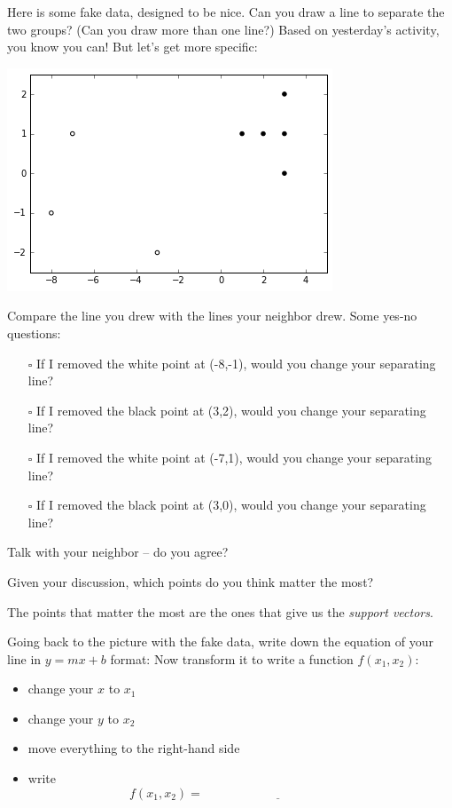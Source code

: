 \documentclass[10pt]{article}
\begin{document}
Here is some fake data, designed to be nice. Can you draw a line to separate the two groups? (Can you draw more than one line?) Based on yesterday's activity, you know you can! But let's get more specific:
\begin{center}
\includegraphics{TwoClusters.png}
\end{center}
\pagebreak
Compare the line you drew with the lines your neighbor drew. Some yes-no questions:
\begin{itemize}
\item[$\square$] If I removed the white point at (-8,-1), would you change your separating line?
\item[$\square$] If I removed the black point at (3,2), would you change your separating line?
\item[$\square$] If I removed the white point at (-7,1), would you change your separating line?
\item[$\square$] If I removed the black point at (3,0), would you change your separating line?
\end{itemize}
Talk with your neighbor -- do you agree?
\vspace{1in}
	
Given your discussion, which points do you think matter the most?

\vspace{1in}
The points that matter the most are the ones that give us the \textit{support vectors}.
\bigskip

Going back to the picture with the fake data, write down the equation of your line in $y=mx+b$ format:
\vspace{.75in}
Now transform it to write a function $f(x_1,x_2)$:
\begin{itemize}
\item change your $x$ to $x_1$
\item change your $y$ to $x_2$
\item move everything to the right-hand side
\item write \[f(x_1,x_2 ) = \underline{\hspace{2in}}\]
\end{itemize}
\end{document}
